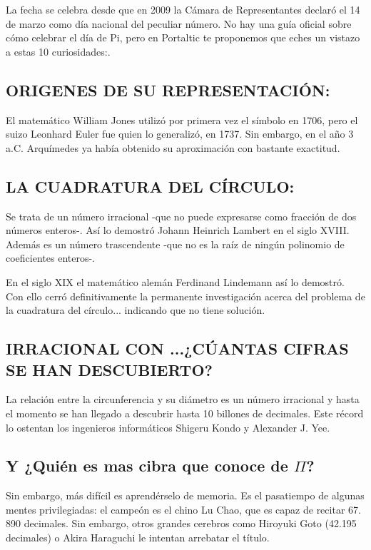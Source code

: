 \documentclass[a4paper,12pt]{article}
\theoremstyle{definition}
\theoremstyle{remark}
\begin{document}
\noindent La fecha se celebra desde que en 2009 la Cámara de Representantes declaró el 14 de marzo como día nacional del peculiar número. No hay una guía oficial sobre cómo celebrar el día de Pi, pero en Portaltic te proponemos que eches un vistazo a estas 10 curiosidades:\cite{Libro_Visual}.

\subsection{ORIGENES DE SU REPRESENTACIÓN:}
 El matemático William Jones utilizó por primera vez el 	símbolo en 1706, pero el suizo Leonhard Euler fue quien lo generalizó, en 1737. Sin embargo, en el año 3 a.C. Arquímedes ya había obtenido su aproximación con bastante exactitud.
 
\subsection{LA CUADRATURA DEL CÍRCULO:} 
 Se trata de un número irracional -que no puede expresarse como fracción de dos números enteros-. Así lo demostró Johann Heinrich Lambert en el siglo XVIII. Además es un número trascendente -que no es la raíz de ningún polinomio de coeficientes enteros-.

   En el siglo XIX el matemático alemán Ferdinand Lindemann así lo demostró. Con ello cerró definitivamente la permanente investigación acerca del problema de la cuadratura del círculo... indicando que no tiene solución.
   
\subsection{IRRACIONAL CON ...¿CÚANTAS CIFRAS SE HAN DESCUBIERTO?}
 La relación entre la circunferencia y su diámetro es un número irracional y hasta el momento se han llegado a descubrir hasta 10 billones de decimales. Este récord lo ostentan los ingenieros informáticos Shigeru Kondo y Alexander J. Yee.
 
 \subsection{Y ¿Quién es mas cibra que conoce de $\Pi$?}
  Sin embargo, más difícil es aprendérselo de memoria. Es el pasatiempo de algunas mentes privilegiadas: el campeón es el chino Lu Chao, que es capaz de recitar 67. 890 decimales. Sin embargo, otros grandes cerebros como Hiroyuki Goto (42.195 decimales) o Akira Haraguchi le intentan arrebatar el título.
   
\end{document}
